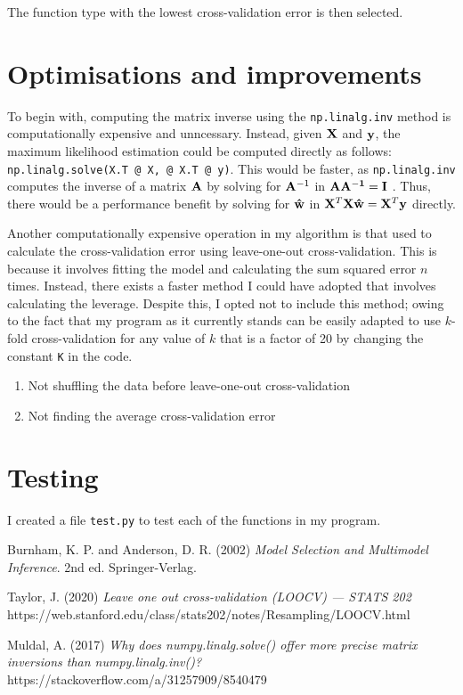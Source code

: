 \documentclass[onecolumn, 12pt, a4paper]{article}
\begin{document}
The function type with the lowest cross-validation error is then selected.

\section{Optimisations and improvements}

To begin with,
computing the matrix inverse using the \texttt{np.linalg.inv}
method is computationally expensive and unncessary.
Instead, given $\vb{X}$ and $\vb{y}$, the maximum likelihood
estimation could be computed directly as follows:
\texttt{np.linalg.solve(X.T @ X, @ X.T @ y)}.
This would be faster, as \texttt{np.linalg.inv}
computes the inverse of a matrix $\vb{A}$ by solving for $\vb{A}^{-1}$
in $\vb{AA^{-1} = I}$ \cite{StackOverflow}.
Thus, there would be a performance benefit by solving for
$\vb{\hat{w}}$ in
$\vb{X}^{T} \vb{X} \vb{\hat{w}} = \vb{X}^{T} \vb{y}$ directly.

Another computationally expensive operation in my
algorithm is that used to calculate the cross-validation error 
using leave-one-out cross-validation.
This is because it involves
fitting the model and calculating the sum squared error
$n$ times. 
Instead, there exists a faster method I could have
adopted that involves calculating the leverage.
Despite this, I opted not to include this method; 
owing to the fact that my program as it
currently stands can be easily adapted to use $k$-fold
cross-validation for any value of $k$ that is a factor of 20
by changing the constant \texttt{K} in the code.

\begin{enumerate}
    \item{Not shuffling the data before leave-one-out cross-validation}
    \item{Not finding the average cross-validation error}
\end{enumerate}

\section{Testing}

I created a file \texttt{test.py} to test each of the
functions in my program.

\begin{thebibliography}{9}

    Burnham, K. P. and Anderson, D. R. (2002)
    \textit{Model Selection and Multimodel Inference}.
    2nd ed. Springer-Verlag.

    Taylor, J. (2020)
    \textit{Leave one out cross-validation (LOOCV) --- STATS 202}
    https://web.stanford.edu/class/stats202/notes/Resampling/LOOCV.html

    Muldal, A. (2017)
    \textit{Why does numpy.linalg.solve() offer more precise matrix inversions than numpy.linalg.inv()?}
    https://stackoverflow.com/a/31257909/8540479



\end{thebibliography}
    
\end{document}
